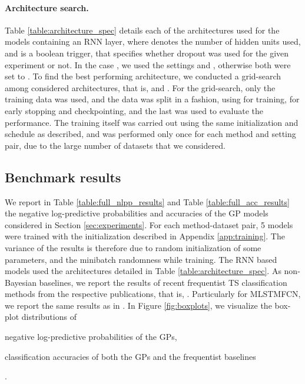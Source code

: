 \documentclass{article}
\begin{document}
\paragraph{Architecture search.}
Table \ref{table:architecture_spec} details each of the architectures used for the models containing an RNN layer, where  denotes the number of hidden units used, and  is a boolean trigger, that specifies whether dropout was used for the given experiment or not. In the case , we used the settings  and , otherwise both were set to . To find the best performing architecture, we conducted a grid-search among  considered architectures, that is,  and . For the grid-search, only the training data was used, and the data was split in a  fashion, using  for training,  for early stopping and checkpointing, and the last  was used to evaluate the performance. The training itself was carried out using the same initialization and schedule as described, and was performed only once for each method and setting pair, due to the large number of datasets that we considered.



\subsection{Benchmark results} \label{app:benchmark}

We report in Table \ref{table:full_nlpp_results} and Table \ref{table:full_acc_results} the negative log-predictive probabilities and accuracies of the GP models considered in Section \ref{sec:experiments}. For each method-dataset pair, 5 models were trained with the initialization described in Appendix \ref{app:training}. The variance of the results is therefore due to random initialization of some parameters, and the minibatch randomness while training. The RNN based models used the architectures detailed in Table \ref{table:architecture_spec}. As non-Bayesian baselines, we report the results of recent frequentist TS classification methods from the respective publications, that is, \cite{Cuturi2011AR, baydogan2015learning, Baydogan2015TimeSR, karlsson2016generalized, tuncel2018autoregressive, Schfer2017MUSE, Karim2019LSTMFCN}. Particularly for MLSTMFCN, we report the same results as in \cite{Schfer2017MUSE}. In Figure \ref{fig:boxplots}, we visualize the box-plot distributions of \begin{enumerate*}[label=(\arabic*)] \item negative log-predictive probabilities of the GPs, \item classification accuracies of both the GPs and the frequentist baselines \end{enumerate*}.
\end{document}
